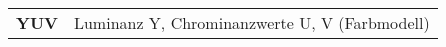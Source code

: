 \begin{center}
\begin{tabular}{ll}
\textbf{YUV}	&	Luminanz Y, Chrominanzwerte U, V (Farbmodell)\\



\end{tabular}
\end{center}














